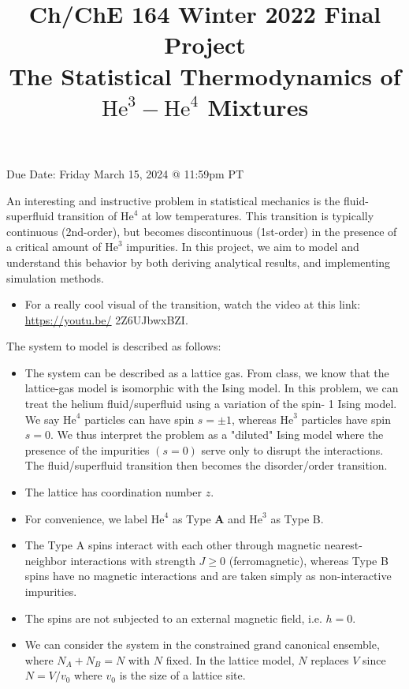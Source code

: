\documentclass[12pt]{article}
\title{Ch/ChE 164 Winter 2022 Final Project \\
 The Statistical Thermodynamics of $\mathrm{He}^{3}-\mathrm{He}^{4}$ Mixtures }
\author{}
\date{}
\begin{document}
\maketitle
Due Date: Friday March 15, 2024 @ 11:59pm PT

An interesting and instructive problem in statistical mechanics is the fluid-superfluid transition of $\mathrm{He}^{4}$ at low temperatures. This transition is typically continuous (2nd-order), but becomes discontinuous (1st-order) in the presence of a critical amount of $\mathrm{He}^{3}$ impurities. In this project, we aim to model and understand this behavior by both deriving analytical results, and implementing simulation methods.

\begin{itemize}
  \item For a really cool visual of the transition, watch the video at this link: \href{https://youtu.be/}{https://youtu.be/} 2Z6UJbwxBZI.
\end{itemize}

The system to model is described as follows:

\begin{itemize}
  \item The system can be described as a lattice gas. From class, we know that the lattice-gas model is isomorphic with the Ising model. In this problem, we can treat the helium fluid/superfluid using a variation of the spin- 1 Ising model. We say $\mathrm{He}^{4}$ particles can have spin $s= \pm 1$, whereas $\mathrm{He}^{3}$ particles have spin $s=0$. We thus interpret the problem as a "diluted" Ising model where the presence of the impurities $(s=0)$ serve only to disrupt the interactions. The fluid/superfluid transition then becomes the disorder/order transition.
  \item The lattice has coordination number $z$.
  \item For convenience, we label $\mathrm{He}^{4}$ as Type $\mathbf{A}$ and $\mathrm{He}^{3}$ as Type B.
  \item The Type A spins interact with each other through magnetic nearest-neighbor interactions with strength $J \geq 0$ (ferromagnetic), whereas Type B spins have no magnetic interactions and are taken simply as non-interactive impurities.
  \item The spins are not subjected to an external magnetic field, i.e. $h=0$.
  \item We can consider the system in the constrained grand canonical ensemble, where $N_{A}+N_{B}=N$ with $N$ fixed. In the lattice model, $N$ replaces $V$ since $N=V / v_{0}$ where $v_{0}$ is the size of a lattice site.
\end{itemize}
\end{document}
